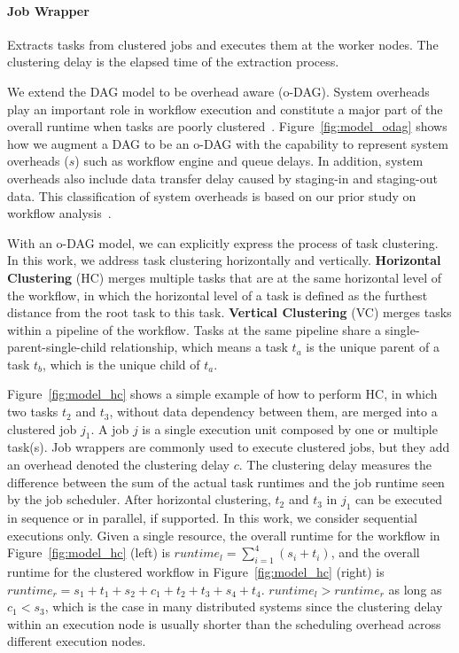 \paragraph{Job Wrapper} Extracts tasks from clustered jobs and executes them at the worker nodes. The clustering delay is the  elapsed time of the extraction process.

We extend the DAG model to be overhead aware (o-DAG). System overheads play an important role in workflow execution and constitute a major part of the overall runtime when tasks are poorly clustered~\cite{Chen2011}. Figure~\ref{fig:model_odag} shows how we augment a DAG to be an o-DAG with the capability to represent system overheads ($s$) such as workflow engine and queue delays. In addition, system overheads also include data transfer delay caused by staging-in and staging-out data. This classification of system overheads is based on our prior study on workflow analysis~\cite{Chen2011}. 

With an o-DAG model, we can explicitly express the process of task clustering. In this work, we address task clustering horizontally and vertically. \textbf{Horizontal Clustering} (HC) merges multiple tasks that are at the same horizontal level of the workflow, in which the horizontal level of a task is defined as the furthest distance from the root task to this task. \textbf{Vertical Clustering} (VC) merges tasks within a pipeline of the workflow. Tasks at the same pipeline share a single-parent-single-child relationship, which means a task $t_a$ is the unique parent of a task $t_b$, which is the unique child of $t_a$. 

Figure~\ref{fig:model_hc} shows a simple example of how to perform HC, in which two tasks $t_2$ and $t_3$, without data dependency between them, are merged into a clustered job $j_1$. A job $j$ is a single execution unit composed by one or multiple task(s). Job wrappers are commonly used to execute clustered jobs, but they add an overhead denoted the clustering delay $c$. The clustering delay measures the difference between the sum of the actual task runtimes and the job runtime seen by the job scheduler. 
After horizontal clustering, $t_2$ and $t_3$ in $j_1$ can be executed in sequence or in parallel, if supported. In this work, we consider sequential executions only. Given a single resource, the overall runtime for the workflow in Figure~\ref{fig:model_hc} (left) is $runtime_l= \sum_{i=1}^{4}(s_i+t_i)$, and the overall runtime for the clustered workflow in Figure~\ref{fig:model_hc} (right) is $runtime_r=s_1+t_1+s_2+c_1+t_2+t_3+s_4+t_4$.  $runtime_l > runtime_r$ as long as $c_1 < s_3$, which is the case in many distributed systems since the clustering delay within an execution node is usually shorter than the scheduling overhead across different execution nodes. 

